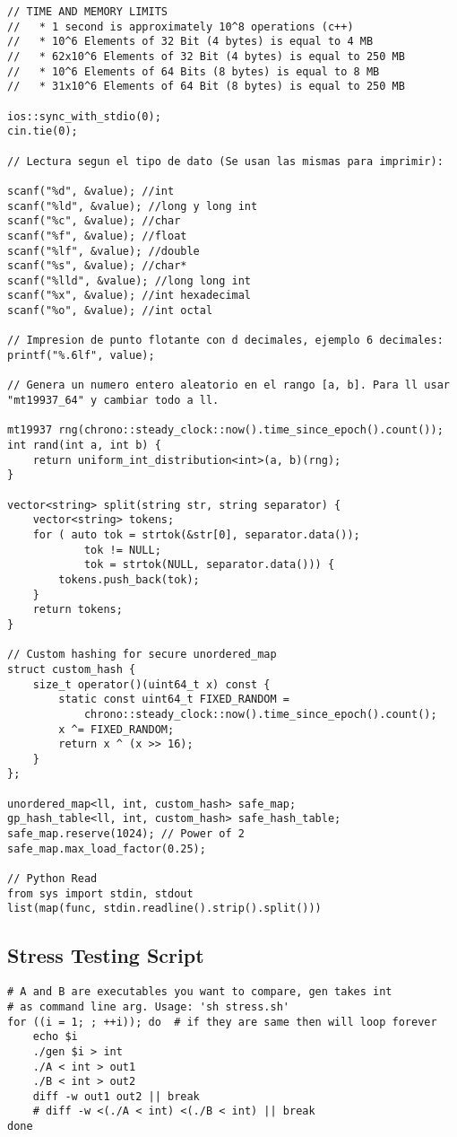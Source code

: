 \documentclass[10pt,letterpaper,twocolumn,twosided]{article}
\begin{document}
\begin{lstlisting}
// TIME AND MEMORY LIMITS
//   * 1 second is approximately 10^8 operations (c++)
//   * 10^6 Elements of 32 Bit (4 bytes) is equal to 4 MB
//   * 62x10^6 Elements of 32 Bit (4 bytes) is equal to 250 MB
//   * 10^6 Elements of 64 Bits (8 bytes) is equal to 8 MB
//   * 31x10^6 Elements of 64 Bit (8 bytes) is equal to 250 MB

ios::sync_with_stdio(0);
cin.tie(0);

// Lectura segun el tipo de dato (Se usan las mismas para imprimir):

scanf("%d", &value); //int
scanf("%ld", &value); //long y long int
scanf("%c", &value); //char 
scanf("%f", &value); //float
scanf("%lf", &value); //double
scanf("%s", &value); //char*
scanf("%lld", &value); //long long int
scanf("%x", &value); //int hexadecimal
scanf("%o", &value); //int octal

// Impresion de punto flotante con d decimales, ejemplo 6 decimales:
printf("%.6lf", value);

// Genera un numero entero aleatorio en el rango [a, b]. Para ll usar "mt19937_64" y cambiar todo a ll.

mt19937 rng(chrono::steady_clock::now().time_since_epoch().count());
int rand(int a, int b) {
    return uniform_int_distribution<int>(a, b)(rng);
}

vector<string> split(string str, string separator) {
    vector<string> tokens;
    for ( auto tok = strtok(&str[0], separator.data());
            tok != NULL;
            tok = strtok(NULL, separator.data())) {
        tokens.push_back(tok);
    }
    return tokens;
}

// Custom hashing for secure unordered_map
struct custom_hash {
    size_t operator()(uint64_t x) const {
        static const uint64_t FIXED_RANDOM = 
            chrono::steady_clock::now().time_since_epoch().count();
        x ^= FIXED_RANDOM;
        return x ^ (x >> 16);
    }
};

unordered_map<ll, int, custom_hash> safe_map;
gp_hash_table<ll, int, custom_hash> safe_hash_table;
safe_map.reserve(1024); // Power of 2
safe_map.max_load_factor(0.25);

// Python Read
from sys import stdin, stdout
list(map(func, stdin.readline().strip().split()))
\end{lstlisting}

\subsection{Stress Testing Script}
\begin{lstlisting}
# A and B are executables you want to compare, gen takes int
# as command line arg. Usage: 'sh stress.sh'
for ((i = 1; ; ++i)); do  # if they are same then will loop forever
    echo $i
    ./gen $i > int
    ./A < int > out1
    ./B < int > out2
    diff -w out1 out2 || break
    # diff -w <(./A < int) <(./B < int) || break
done
\end{lstlisting}
\end{document}
